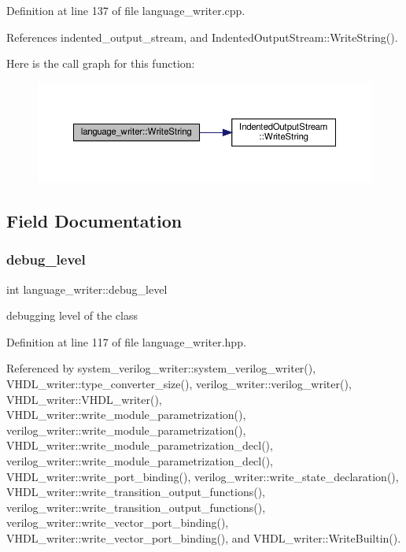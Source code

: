 Definition at line 137 of file language\+\_\+writer.\+cpp.



References indented\+\_\+output\+\_\+stream, and Indented\+Output\+Stream\+::\+Write\+String().

Here is the call graph for this function\+:
\nopagebreak
\begin{figure}[H]
\begin{center}
\leavevmode
\includegraphics[width=350pt]{d6/d67/classlanguage__writer_a12e31915cd8caac0dfaf0bd5737a7a41_cgraph}
\end{center}
\end{figure}


\subsection{Field Documentation}
\mbox{\label{classlanguage__writer_a5e8eec93e3573a1ea49968af8da2996a}} 
\subsubsection{\texorpdfstring{debug\+\_\+level}{debug\_level}}
{\footnotesize\ttfamily int language\+\_\+writer\+::debug\+\_\+level\hspace{0.3cm}{\ttfamily [protected]}}



debugging level of the class 



Definition at line 117 of file language\+\_\+writer.\+hpp.



Referenced by system\+\_\+verilog\+\_\+writer\+::system\+\_\+verilog\+\_\+writer(), V\+H\+D\+L\+\_\+writer\+::type\+\_\+converter\+\_\+size(), verilog\+\_\+writer\+::verilog\+\_\+writer(), V\+H\+D\+L\+\_\+writer\+::\+V\+H\+D\+L\+\_\+writer(), V\+H\+D\+L\+\_\+writer\+::write\+\_\+module\+\_\+parametrization(), verilog\+\_\+writer\+::write\+\_\+module\+\_\+parametrization(), V\+H\+D\+L\+\_\+writer\+::write\+\_\+module\+\_\+parametrization\+\_\+decl(), verilog\+\_\+writer\+::write\+\_\+module\+\_\+parametrization\+\_\+decl(), V\+H\+D\+L\+\_\+writer\+::write\+\_\+port\+\_\+binding(), verilog\+\_\+writer\+::write\+\_\+state\+\_\+declaration(), V\+H\+D\+L\+\_\+writer\+::write\+\_\+transition\+\_\+output\+\_\+functions(), verilog\+\_\+writer\+::write\+\_\+transition\+\_\+output\+\_\+functions(), verilog\+\_\+writer\+::write\+\_\+vector\+\_\+port\+\_\+binding(), V\+H\+D\+L\+\_\+writer\+::write\+\_\+vector\+\_\+port\+\_\+binding(), and V\+H\+D\+L\+\_\+writer\+::\+Write\+Builtin().

